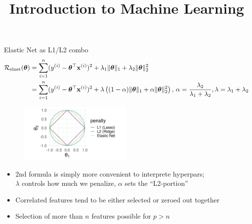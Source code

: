 \documentclass[11pt,compress,t,notes=noshow, xcolor=table]{beamer}
\title{Introduction to Machine Learning}
\begin{document}

\begin{vbframe}{Elastic Net as L1/L2 combo }
\vspace{-0.7cm}
\small{
\begin{align*}
\mathcal{R}_{\text{elnet}}(\bm{\theta}) &=  \sum\limits_{i=1}^n (y^{(i)} - \bm{\theta}^\top \mathbf{x}^{(i)})^2 + \lambda_1 \|\bm{\theta}\|_1 + \lambda_2 \|\bm{\theta}\|_2^2 \\
&= \sum\limits_{i=1}^n (y^{(i)} - \bm{\theta}^\top \mathbf{x}^{(i)})^2 + \lambda \left( (1-\alpha) \|\bm{\theta}\|_1 + \alpha \|\bm{\theta}\|_2^2\right),\, \alpha=\frac{\lambda_2}{\lambda_1+\lambda_2}, \lambda=\lambda_1+\lambda_2
\end{align*}}
\begin{figure}
\vspace{-0.3cm}
\includegraphics[width=0.5\textwidth]{figure/lasso_ridge_enet_2d.png}\\
\end{figure}
\vspace{-0.3cm}
\begin{itemize}
\item 2nd formula is simply more convenient to interprete hyperpars;\\
    $\lambda$ controls how much we penalize, $\alpha$ sets the ``L2-portion''
\item Correlated features tend to be either selected or zeroed out together
\item Selection of more than $n$ features possible for $p>n$
\end{itemize}
\end{vbframe}
\end{document}
